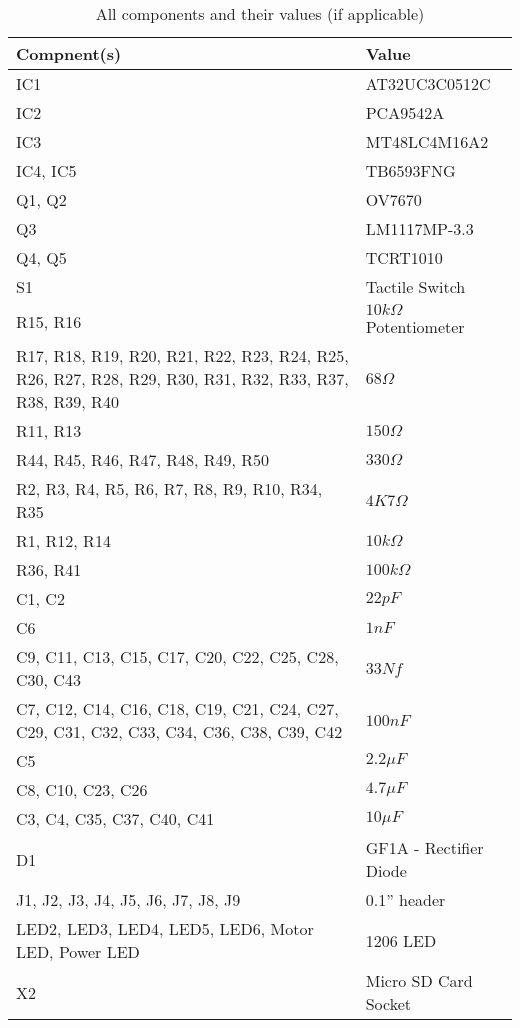 \begin{table}
\caption{All components and their values (if applicable)}
\label{table:Components}
\begin{tabular}{|p{7cm}|p{5cm}|}\hline
Compnent(s)		&	Value \\ \hline
IC1				&	AT32UC3C0512C \\
IC2 & PCA9542A \\
IC3 & MT48LC4M16A2 \\
IC4, IC5 & TB6593FNG \\
Q1, Q2 & OV7670 \\
Q3	&	LM1117MP-3.3\\
Q4, Q5	& TCRT1010 \\
S1				&	Tactile Switch \\
R15, R16 & $10k\Omega$ Potentiometer\\
R17, R18, R19, R20, R21, R22, R23, R24, R25, R26, R27, R28, R29, R30, R31, R32, R33, R37, R38, R39, R40 & $68\Omega $ \\
R11, R13 & $150\Omega$ \\
R44, R45, R46, R47, R48, R49, R50	& $330\Omega$ \\
R2, R3, R4, R5, R6, R7, R8, R9, R10,  R34, R35 & $4K7\Omega$ \\
R1, R12, R14	& $10k\Omega$ \\
R36, R41	& $100k\Omega$ \\

C1, C2	&	$22pF$ \\
C6 & $1nF$ \\
C9, C11, C13, C15, C17, C20, C22, C25, C28, C30, C43 & $33Nf$ \\
C7, C12, C14, C16, C18, C19, C21, C24, C27, C29, C31, C32, C33, C34, C36, C38, C39, C42	&	$100nF$ \\
C5	&	$2.2\mu F$ \\
C8, C10, C23, C26  & $4.7\mu F $ \\
C3, C4, C35, C37, C40, C41 &	$10\mu F$ \\

D1 & GF1A - Rectifier Diode \\
J1, J2, J3, J4, J5, J6, J7, J8, J9 & 0.1'' header \\
LED2, LED3, LED4, LED5, LED6, Motor LED, Power LED	&	1206 LED \\ 
X2 & Micro SD Card Socket \\ \hline
\end{tabular}
\end{table}